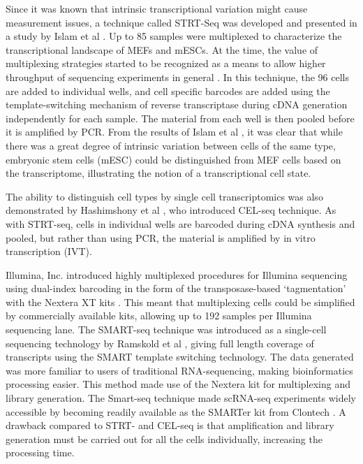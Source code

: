 Since it was known that intrinsic transcriptional variation might cause measurement issues, a technique called STRT-Seq was developed and presented in a study by Islam et al \cite{Islam2011-yy}. Up to 85 samples were multiplexed to characterize the transcriptional landscape of MEFs and mESCs. At the time, the value of multiplexing strategies started to be recognized as a means to allow higher throughput of sequencing experiments in general \cite{Kozarewa2011-we}. In this technique, the 96 cells are added to individual wells, and cell specific barcodes are added using the template-switching mechanism of reverse transcriptase during cDNA generation independently for each sample. The material from each well is then pooled before it is amplified by PCR. From the results of Islam et al \cite{Islam2011-yy}, it was clear that while there was a great degree of intrinsic variation between cells of the same type, embryonic stem cells (mESC) could be distinguished from MEF cells based on the transcriptome, illustrating the notion of a transcriptional cell state.

The ability to distinguish cell types by single cell transcriptomics was also demonstrated by Hashimshony et al \cite{Hashimshony2012-am}, who introduced CEL-seq technique. As with STRT-seq, cells in individual wells are barcoded during cDNA synthesis and pooled, but rather than using PCR, the material is amplified by in vitro transcription (IVT).

Illumina, Inc. introduced highly multiplexed procedures for Illumina sequencing using dual-index barcoding in the form of the transposase-based ‘tagmentation’ with the Nextera XT kits \cite{Illumina_Inc2012-mf}. This meant that multiplexing cells could be simplified by commercially available kits, allowing up to 192 samples per Illumina sequencing lane. The SMART-seq technique was introduced as a single-cell sequencing technology by Ramskold et al \cite{Ramskold2012-zc}, giving full length coverage of transcripts using the SMART template switching technology. The data generated was more familiar to users of traditional RNA-sequencing, making bioinformatics processing easier. This method made use of the Nextera kit for multiplexing and library generation. The Smart-seq technique made scRNA-seq experiments widely accessible by becoming readily available as the SMARTer kit from Clontech \cite{Clontech_Laboratories_Inc2013-zf}. A drawback compared to STRT- and CEL-seq is that amplification and library generation must be carried out for all the cells individually, increasing the processing time.

